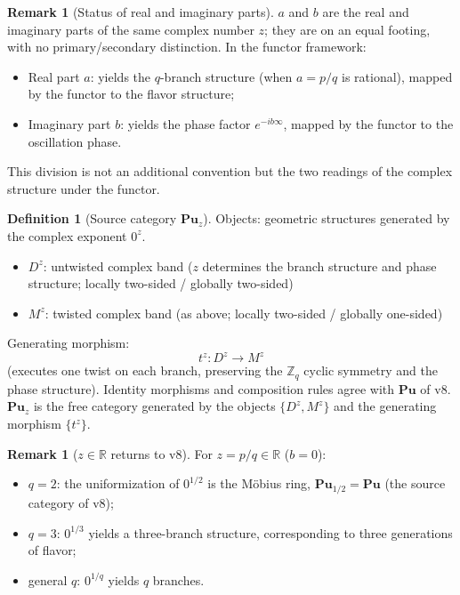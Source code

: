 \documentclass[11pt]{article}
\theoremstyle{plain}
\theoremstyle{definition}
\newtheorem{defn}[thm]{Definition}
\newtheorem{rem}[thm]{Remark}
\newcommand{\Cat}{\mathbf}
\begin{document}
\begin{rem}[Status of real and imaginary parts]\label{rem:ab}
$a$ and $b$ are the real and imaginary parts of the same complex number
$z$; they are on an equal footing, with no primary/secondary distinction.
In the functor framework:
\begin{itemize}
\item Real part $a$: yields the $q$-branch structure (when $a = p/q$ is
rational), mapped by the functor to the flavor structure;
\item Imaginary part $b$: yields the phase factor $e^{-ib\infty}$, mapped by
the functor to the oscillation phase.
\end{itemize}
This division is not an additional convention but the two readings of the
complex structure under the functor.
\end{rem}

\begin{defn}[Source category $\Cat{Pu}_z$]\label{def:puz}
Objects: geometric structures generated by the complex exponent $0^z$.
\begin{itemize}
\item $D^z$: untwisted complex band ($z$ determines the branch structure
and phase structure; locally two-sided / globally two-sided)
\item $M^z$: twisted complex band (as above; locally two-sided / globally
one-sided)
\end{itemize}
Generating morphism:
\[
t^z: D^z \to M^z
\]
(executes one twist on each branch, preserving the $\mathbb{Z}_q$ cyclic
symmetry and the phase structure). Identity morphisms and composition rules
agree with $\Cat{Pu}$ of v8. $\Cat{Pu}_z$ is the free category generated by
the objects $\{D^z,M^z\}$ and the generating morphism $\{t^z\}$.
\end{defn}

\begin{rem}[$z\in\mathbb{R}$ returns to v8]\label{rem:backtov8}
For $z = p/q\in\mathbb{R}$ ($b=0$):
\begin{itemize}
\item $q=2$: the uniformization of $0^{1/2}$ is the M\"obius ring,
$\Cat{Pu}_{1/2} = \Cat{Pu}$ (the source category of v8);
\item $q=3$: $0^{1/3}$ yields a three-branch structure, corresponding to
three generations of flavor;
\item general $q$: $0^{1/q}$ yields $q$ branches.
\end{itemize}
\end{rem}
\end{document}
